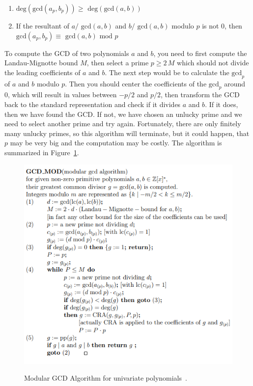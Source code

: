 \begin{enumerate}
    \item $\text{deg}(\text{gcd}(a_{p}, b_{p})) \geq \text{ deg}(\text{gcd}(a, b))$
    \item If the resultant of $a / \text{ gcd}(a, b)$ and $b / \text{ gcd}(a, b)$ modulo $p$ is not 0, then $\text{gcd}(a_p, b_p) \equiv \text{ gcd}(a, b) \text{ mod } p$
\end{enumerate}To compute the GCD of two polynomials $a$ and $b$, you need to first compute the Landau-Mignotte bound $M$, then select a prime $p \geq 2 \, M$ which should not divide the leading coefficients of $a$ and $b$. The next step would be to calculate the $\text{gcd}_p$ of $a$ and $b$ modulo $p$. Then you should center the coefficients of the $\text{gcd}_p$ around 0, which will result in values between $-p/2$ and $p/2$, then transform the GCD back to the standard representation and check if it divides $a$ and $b$. If it does, then we have found the GCD. If not, we have chosen an unlucky prime and we need to select another prime and try again. Fortunately, there are only finitely many unlucky primes, so this algorithm will terminate, but it could happen, that $p$ may be very big and the computation may be costly. The algorithm is summarized in Figure~\ref{fig:GCDUni}.

\begin{figure}
\caption{Modular GCD Algorithm for univariate polynomials~\cite{winkler1996}.}
\centering
\includegraphics[scale=0.6]{texfiles/polynomial.PNG}
 \label{fig:GCDUni}
\end{figure}

